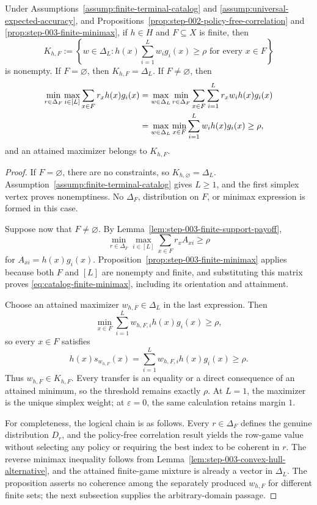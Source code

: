 \begin{proposition}
\label{prop:step-003-finite-feasibility}
Under Assumptions~\ref{assump:finite-terminal-catalog} and
\ref{assump:universal-expected-accuracy}, and
Propositions~\ref{prop:step-002-policy-free-correlation} and
\ref{prop:step-003-finite-minimax}, if $h\in H$ and $F\subseteq X$ is
finite, then
\[
K_{h,F}:=\left\{w\in\Delta_L:
h(x)\sum_{i=1}^Lw_i g_i(x)\ge\rho
\text{ for every }x\in F\right\}
\]
is nonempty.  If $F=\varnothing$, then
$K_{h,F}=\Delta_L$.  If $F\ne\varnothing$, then
\begin{align}
\min_{r\in\Delta_F}\max_{i\in[L]}
\sum_{x\in F}r_xh(x)g_i(x)
&=\max_{w\in\Delta_L}\min_{r\in\Delta_F}
\sum_{x\in F}\sum_{i=1}^Lr_xw_i h(x)g_i(x)\notag\\
&=\max_{w\in\Delta_L}\min_{x\in F}
\sum_{i=1}^Lw_i h(x)g_i(x)
\ge\rho,
\label{eq:catalog-finite-minimax}
\end{align}
and an attained maximizer belongs to $K_{h,F}$.
\end{proposition}

\begin{proof}
If $F=\varnothing$, there are no constraints, so
$K_{h,\varnothing}=\Delta_L$.  Assumption~\ref{assump:finite-terminal-catalog}
gives $L\ge1$, and the first simplex vertex proves nonemptiness.  No
$\Delta_F$, distribution on $F$, or minimax expression is formed in this
case.

Suppose now that $F\ne\varnothing$.  By
Lemma~\ref{lem:step-003-finite-support-payoff},
\[
\min_{r\in\Delta_F}\max_{i\in[L]}
\sum_{x\in F}r_xA_{xi}\ge\rho
\]
for $A_{xi}=h(x)g_i(x)$.  Proposition~\ref{prop:step-003-finite-minimax}
applies because both $F$ and $[L]$ are nonempty and finite, and substituting
this matrix proves \eqref{eq:catalog-finite-minimax}, including its
orientation and attainment.

Choose an attained maximizer $w_{h,F}\in\Delta_L$ in the last expression.
Then
\[
\min_{x\in F}\sum_{i=1}^Lw_{h,F,i}h(x)g_i(x)\ge\rho,
\]
so every $x\in F$ satisfies
\[
h(x)s_{w_{h,F}}(x)
=\sum_{i=1}^Lw_{h,F,i}h(x)g_i(x)\ge\rho.
\]
Thus $w_{h,F}\in K_{h,F}$.  Every transfer is an equality or a direct
consequence of an attained minimum, so the threshold remains exactly $\rho$.
At $L=1$, the maximizer is the unique simplex weight; at
$\varepsilon=0$, the same calculation retains margin $1$.

For completeness, the logical chain is as follows.  Every
$r\in\Delta_F$ defines the genuine distribution $D_r$, and the policy-free
correlation result yields the row-game value without selecting any policy or
requiring the best index to be coherent in $r$.  The reverse minimax
inequality follows from Lemma~\ref{lem:step-003-convex-hull-alternative}, and
the attained finite-game mixture is already a vector in $\Delta_L$.
The proposition asserts no coherence among the separately produced
$w_{h,F}$ for different finite sets; the next subsection supplies the
arbitrary-domain passage.
\end{proof}

